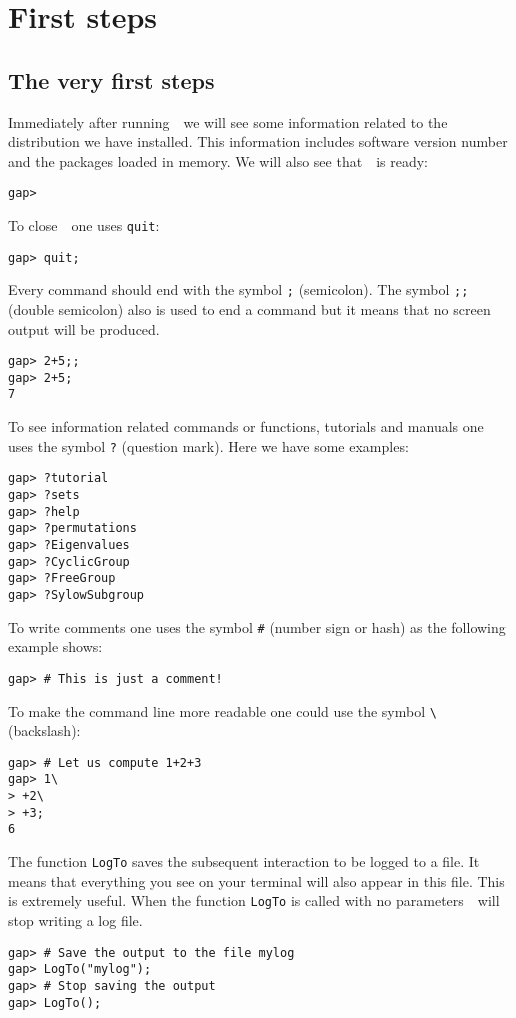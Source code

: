 \chapter{First steps}
\label{first} 

\section{The very first steps}
\label{section:primeros_pasos}

Immediately after running~\GAP~we will see some information related to the
distribution we have installed.  This information includes software version
number and the packages loaded in memory. 
We will also see that~\GAP~is ready:
\begin{lstlisting}
gap>
\end{lstlisting}

To close~\GAP~one uses \lstinline{quit}:
\begin{lstlisting}
gap> quit;
\end{lstlisting}

Every command should end with the symbol \lstinline{;} (semicolon). The symbol
\lstinline{;;} (double semicolon) also is used to end a command but it means
that no screen output will be produced. 

\begin{lstlisting}
gap> 2+5;;
gap> 2+5;
7
\end{lstlisting}

To see information related commands or functions, tutorials and manuals one
uses the symbol \lstinline{?} (question mark). Here we have some examples:
\begin{lstlisting}
gap> ?tutorial
gap> ?sets
gap> ?help
gap> ?permutations
gap> ?Eigenvalues
gap> ?CyclicGroup
gap> ?FreeGroup
gap> ?SylowSubgroup
\end{lstlisting}

To write comments one uses the symbol \lstinline{#} (number sign or hash) as
the following example shows:
\begin{lstlisting}
gap> # This is just a comment!
\end{lstlisting}

To make the command line more readable one could use
the symbol \lstinline{\} (backslash):
\begin{lstlisting}
gap> # Let us compute 1+2+3
gap> 1\
> +2\
> +3;
6
\end{lstlisting}

The function \lstinline{LogTo} saves the subsequent interaction to be logged to
a file. It means that everything you see on your terminal will also appear in
this file. This is extremely useful.  When the function \lstinline{LogTo} is
called with no parameters~\GAP~will stop writing a log file.
\begin{lstlisting}
gap> # Save the output to the file mylog
gap> LogTo("mylog");
gap> # Stop saving the output
gap> LogTo();
\end{lstlisting}

